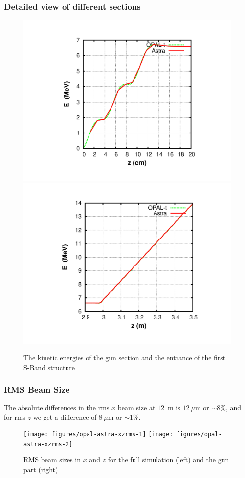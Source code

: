 \documentclass{psi-note}    %
\begin{document}
\subsubsection{Detailed view of different sections}
\begin{figure}[htbp]
\begin{center}
\includegraphics[width=.49\linewidth,angle=0]{figures/opal-astra-energy-2}
\includegraphics[width=.49\linewidth,angle=0]{figures/opal-astra-energy-3}
\caption{The kinetic energies of the gun section and the entrance of the first S-Band structure }
\label{fig:opal-astra-energy-1}
\end{center}
\end{figure}


\subsubsection{RMS Beam Size}

The absolute differences in the rms $x$ beam size at $12$~m is $12~\mu$m or
$\sim 8$\%, and for rms $z$ we get a difference of $8~\mu$m or $\sim 1$\%.
\begin{figure}[htbp]
\begin{center}
\texttt{[image: figures/opal-astra-xzrms-1]}
\texttt{[image: figures/opal-astra-xzrms-2]}
\caption{ RMS beam sizes in $x$ and $z$ for the full simulation (left) and the gun part (right) }
\label{fig:opal-astra-energy-1}
\end{center}
\end{figure}
\end{document}
